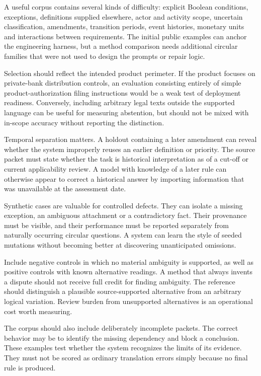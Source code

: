 A useful corpus contains several kinds of difficulty: explicit Boolean conditions,
exceptions, definitions supplied elsewhere, actor and activity scope, uncertain
classification, amendments, transition periods, event histories, monetary units
and interactions between requirements. The initial public examples can anchor the
engineering harness, but a method comparison needs additional circular families
that were not used to design the prompts or repair logic.

Selection should reflect the intended product perimeter. If the product focuses
on private-bank distribution controls, an evaluation consisting entirely of simple
product-authorization filing instructions would be a weak test of deployment
readiness. Conversely, including arbitrary legal texts outside the supported
language can be useful for measuring abstention, but should not be mixed with
in-scope accuracy without reporting the distinction.

Temporal separation matters. A holdout containing a later amendment can reveal
whether the system improperly reuses an earlier definition or priority. The
source packet must state whether the task is historical interpretation as of a
cut-off or current applicability review. A model with knowledge of a later rule
can otherwise appear to correct a historical answer by importing information
that was unavailable at the assessment date.


Synthetic cases are valuable for controlled defects. They can isolate a missing
exception, an ambiguous attachment or a contradictory fact. Their provenance must
be visible, and their performance must be reported separately from naturally
occurring circular questions. A system can learn the style of seeded mutations
without becoming better at discovering unanticipated omissions.

Include negative controls in which no material ambiguity is supported, as well
as positive controls with known alternative readings. A method that always
invents a dispute should not receive full credit for finding ambiguity. The
reference should distinguish a plausible source-supported alternative from an
arbitrary logical variation. Review burden from unsupported alternatives is an
operational cost worth measuring.

The corpus should also include deliberately incomplete packets. The correct
behavior may be to identify the missing dependency and block a conclusion. These
examples test whether the system recognizes the limits of its evidence. They
must not be scored as ordinary translation errors simply because no final rule
is produced.

